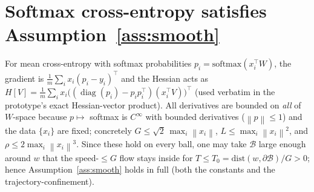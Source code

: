 \documentclass[11pt]{article}
\theoremstyle{definition}
\newcommand{\norm}[1]{\left\lVert#1\right\rVert}
\DeclareMathOperator{\diag}{diag}
\begin{document}
\appendix
\section{Softmax cross-entropy satisfies Assumption~\ref{ass:smooth}}
For mean cross-entropy with softmax probabilities $p_i=\mathrm{softmax}(x_i^\top W)$,
the gradient is $\tfrac1m\sum_i x_i(p_i-y_i)^\top$ and the Hessian acts as
$H[V]=\tfrac1m\sum_i x_i\big((\diag(p_i)-p_ip_i^\top)(x_i^\top V)\big)^\top$
(used verbatim in the prototype's exact Hessian-vector product). All derivatives
are bounded on \emph{all} of $W$-space because $p\mapsto$ softmax is $C^\infty$
with bounded derivatives ($\norm{p}\le1$) and the data $\{x_i\}$ are fixed;
concretely $G\le\sqrt2\,\max_i\norm{x_i}$, $L\le\max_i\norm{x_i}^2$, and
$\rho\le 2\max_i\norm{x_i}^3$. Since these hold on every ball, one may take
$\mathcal B$ large enough around $w$ that the speed-$\le G$ flow stays inside for
$T\le T_0=\mathrm{dist}(w,\partial\mathcal B)/G>0$; hence
Assumption~\ref{ass:smooth} holds in full (both the constants and the
trajectory-confinement).
\end{document}
